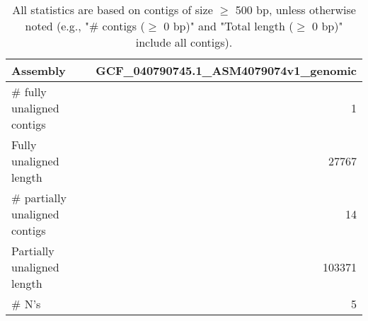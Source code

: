 \documentclass[12pt,a4paper]{article}
\begin{document}
\begin{table}[ht]
\begin{center}
\caption{All statistics are based on contigs of size $\geq$ 500 bp, unless otherwise noted (e.g., "\# contigs ($\geq$ 0 bp)" and "Total length ($\geq$ 0 bp)" include all contigs).}
\begin{tabular}{|l*{1}{|r}|}
\hline
Assembly & GCF\_040790745.1\_ASM4079074v1\_genomic \\ \hline
\# fully unaligned contigs & 1 \\ \hline
Fully unaligned length & 27767 \\ \hline
\# partially unaligned contigs & 14 \\ \hline
Partially unaligned length & 103371 \\ \hline
\# N's & 5 \\ \hline
\end{tabular}
\end{center}
\end{table}
\end{document}
